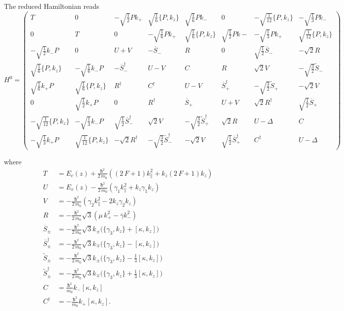 \documentclass[prb,aps]{revtex4}
\begin{document}
		The reduced Hamiltonian reads
		\begin{equation}
		    \renewcommand{\arraystretch}{3.5}
			\label{eq:H0}
			H^0=
			\begin{pmatrix}
				T & 0 &  -\sqrt{\frac12} P k_+  & \sqrt{\frac{1}{6}} \{P, k_z\} &\sqrt{\frac16} P k_- & 0  & -\sqrt{\frac{1}{12}} \{P, k_z\} & -\sqrt{\frac13} P k_-\\
				0 & T & 0 & -\sqrt{\frac16} P k_+ &  \sqrt{\frac{1}{6}} \{P, k_z\} & \sqrt{\frac12} P k- & -\sqrt{\frac13} P k_+ & \sqrt{\frac{1}{12}} \{P, k_z\}\\
				-\sqrt{\frac12}  k_- P & 0 & U+V & -\overline{S}_- & R & 0 & \sqrt{\frac12} \overline{S}_- & -\sqrt{2} R \\
				\sqrt{\frac{1}{6}} \{P, k_z\} & -\sqrt{\frac16} k_- P & - \overline{S}_-^\dagger & U-V & C & R & \sqrt{2} V & -\sqrt{\frac32} \tilde{S}_- \\
				\sqrt{\frac16} k_+ P & \sqrt{\frac{1}{6}} \{P, k_z\} & R^\dagger & C^\dagger & U-V & \overline{S}_+^\dagger & -\sqrt{\frac32} \tilde{S}_+ & -\sqrt{2} V \\
				0 & \sqrt{\frac12} k_+ P & 0 & R^\dagger & \overline{S}_+ & U+V & \sqrt{2} R^\dag & \sqrt{\frac12} \overline{S}_+ \\
				-\sqrt{\frac{1}{12}} \{P, k_z\} & -\sqrt{\frac13} k_- P & \sqrt{\frac12} \overline{S}^{\dag}_- & \sqrt{2} V & -\sqrt{\frac32} \tilde{S}^\dag_+ & \sqrt{2} R & U - Δ & C \\
				-\sqrt{\frac13} k_+ P & \sqrt{\frac{1}{12}} \{P, k_z\} & -\sqrt{2} R^\dag & -\sqrt{\frac32} \tilde{S}_-^\dag & -\sqrt{2} V & \sqrt{\frac12} \overline{S}_+^\dag & C^\dag & U - Δ
			\end{pmatrix}
		\end{equation}

		 where
		 \begin{align}
			 T &= E_c(z) + \frac{ħ^2}{2\,m_0} \left( (2\,F+1) k_\parallel^2 + k_z (2\,F+1) k_z\right)  \\
			 U &= E_v(z) - \frac{ħ^2 }{2\,m_0} \left( γ_1 k_\parallel^2 + k_z γ_1 k_z \right) \\
			 V &=  - \frac{ħ^2 }{2\,m_0} \left( γ_2 k_\parallel^2 -2 k_z γ_2 k_z \right) \\
			R &= - \frac{ħ^2 }{2\,m_0} \sqrt{3} \left( μ\,k_+^2 - \overline{γ} k_-^2 \right) \\
			\overline{S}_\pm &= - \frac{ħ^2 }{2\,m_0} \sqrt{3}  k_\pm \Big( \{ γ_3 , k_z \} + [κ , k_z] \Big) \\
			\overline{S}_\pm^\dagger &= - \frac{ħ^2 }{2\,m_0} \sqrt{3}  k_\mp \Big( \{ γ_3 , k_z \} - [κ , k_z] \Big) \\
			\tilde{S}_\pm &= - \frac{ħ^2 }{2\,m_0} \sqrt{3}  k_\pm \Big( \{ γ_3 , k_z \} - \frac13 [κ , k_z] \Big) \\
			\tilde{S}_\pm^\dagger &= - \frac{ħ^2 }{2\,m_0} \sqrt{3}  k_\mp \Big( \{ γ_3 , k_z \} + \frac13 [κ , k_z] \Big) \\
			C &= \frac{ħ^2 }{m_0} k_- [κ , k_z ]\\
			C^\dagger &= -\frac{ħ^2 }{m_0} k_+ [κ , k_z ]  .
		\end{align}
\end{document}
